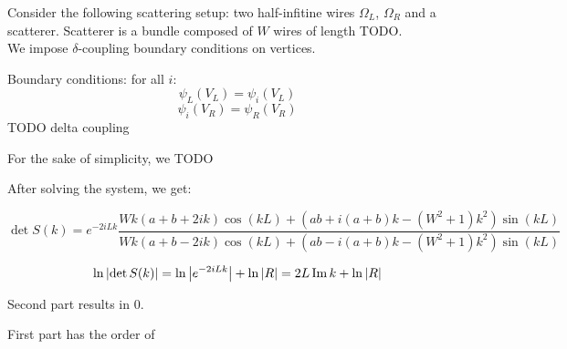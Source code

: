 




Consider the following scattering setup: two half-infitine wires $\Omega_L$, $\Omega_R$ and a scatterer. Scatterer is a bundle composed of $W$ wires of length TODO. \\

We impose $\delta$-coupling boundary conditions on vertices.

Boundary conditions: for all $i$:
\[
\psi_L(V_L) = \psi_i(V_L)
\]
\[
\psi_i(V_R) = \psi_R(V_R)
\]
TODO delta coupling

For the sake of simplicity, we TODO

After solving the system, we get:

\[
\det S(k) = e^{-2 i L k} \frac{
    W k (a + b + 2 i k) \cos(k L) + (a b + i (a + b) k - (W^2 + 1) k^2) \sin(k L)
}{
    W k (a + b - 2 i k) \cos(k L) + (a b - i (a + b) k - (W^2 + 1) k^2) \sin(k L)
}
\]


\[
\ln \abs{\det S(k)} = \ln \abs{e^{-2 i L k}} + \ln \abs{R} = 2 L \Im k + \ln \abs{R}
\]

Second part results in $0$.

First part has the order of 







